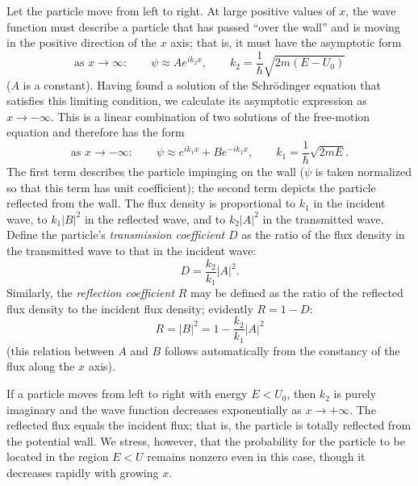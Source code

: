 Let the particle move from left to right. At large positive values of $x$,
the wave function must describe a particle that has passed ``over the wall''
and is moving in the positive direction of the $x$ axis; that is, it must
have the asymptotic form
\begin{equation}
  \text{as }x\to\infty:\qquad
  \psi\approx Ae^{ik_2x},
  \qquad k_2=\frac{1}{\hbar}\sqrt{2m(E-U_0)}
  \tag{25.1}
\end{equation}
($A$ is a constant). Having found a solution of the Schrödinger equation
that satisfies this limiting condition, we calculate its asymptotic
expression as $x\to-\infty$. This is a linear combination of two solutions
of the free-motion equation and therefore has the form
\begin{equation}
  \text{as }x\to-\infty:\qquad
  \psi\approx e^{ik_1x}+Be^{-ik_1x},
  \qquad k_1=\frac{1}{\hbar}\sqrt{2mE}.
  \tag{25.2}
\end{equation}
The first term describes the particle impinging on the wall ($\psi$ is taken
normalized so that this term has unit coefficient); the second term depicts
the particle reflected from the wall. The flux density is
proportional to $k_1$ in the incident wave, to $k_1|B|^2$ in the reflected
wave, and to $k_2|A|^2$ in the transmitted wave. Define the particle's
\emph{transmission coefficient} $D$ as the ratio of the flux density in the
transmitted wave to that in the incident wave:
\begin{equation}
  D=\frac{k_2}{k_1}|A|^2.
  \tag{25.3}
\end{equation}
Similarly, the \emph{reflection coefficient} $R$ may be defined as the ratio
of the reflected flux density to the incident flux density; evidently
$R=1-D$:
\begin{equation}
  R=|B|^2=1-\frac{k_2}{k_1}|A|^2
  \tag{25.4}
\end{equation}
(this relation between $A$ and $B$ follows automatically from the constancy
of the flux along the $x$ axis).

If a particle moves from left to right with energy $E<U_0$, then $k_2$ is
purely imaginary and the wave function decreases exponentially as
$x\to+\infty$. The reflected flux equals the incident flux; that is,
the particle is totally reflected from the potential wall. We stress,
however, that the probability for the particle to be located in the region
$E<U$ remains nonzero even in this case, though it decreases
rapidly with growing $x$.

